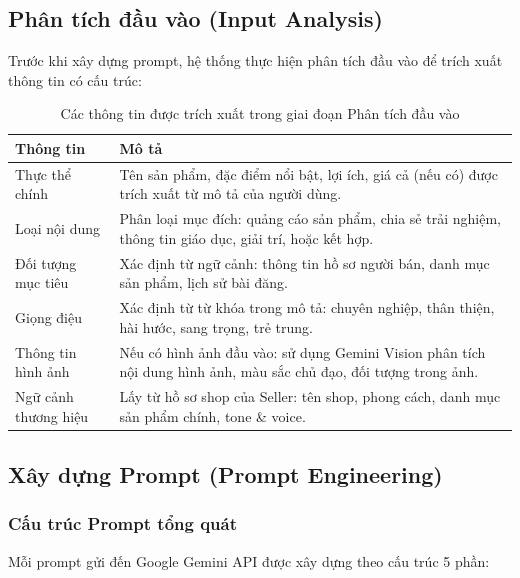 \subsection{Phân tích đầu vào (Input Analysis)}

Trước khi xây dựng prompt, hệ thống thực hiện phân tích đầu vào để trích xuất thông tin có cấu trúc:

\begin{table}[H]
\centering
\renewcommand{\arraystretch}{1.3}
\begin{tabularx}{\textwidth}{|l|X|}
\hline
\textbf{Thông tin} & \textbf{Mô tả} \\ \hline
Thực thể chính & Tên sản phẩm, đặc điểm nổi bật, lợi ích, giá cả (nếu có) được trích xuất từ mô tả của người dùng. \\ \hline
Loại nội dung & Phân loại mục đích: quảng cáo sản phẩm, chia sẻ trải nghiệm, thông tin giáo dục, giải trí, hoặc kết hợp. \\ \hline
Đối tượng mục tiêu & Xác định từ ngữ cảnh: thông tin hồ sơ người bán, danh mục sản phẩm, lịch sử bài đăng. \\ \hline
Giọng điệu & Xác định từ từ khóa trong mô tả: chuyên nghiệp, thân thiện, hài hước, sang trọng, trẻ trung. \\ \hline
Thông tin hình ảnh & Nếu có hình ảnh đầu vào: sử dụng Gemini Vision phân tích nội dung hình ảnh, màu sắc chủ đạo, đối tượng trong ảnh. \\ \hline
Ngữ cảnh thương hiệu & Lấy từ hồ sơ shop của Seller: tên shop, phong cách, danh mục sản phẩm chính, tone \& voice. \\ \hline
\end{tabularx}
\caption{Các thông tin được trích xuất trong giai đoạn Phân tích đầu vào}
\label{tab:input-analysis}
\end{table}

\subsection{Xây dựng Prompt (Prompt Engineering)}

\subsubsection{Cấu trúc Prompt tổng quát}

Mỗi prompt gửi đến Google Gemini API được xây dựng theo cấu trúc 5 phần:

